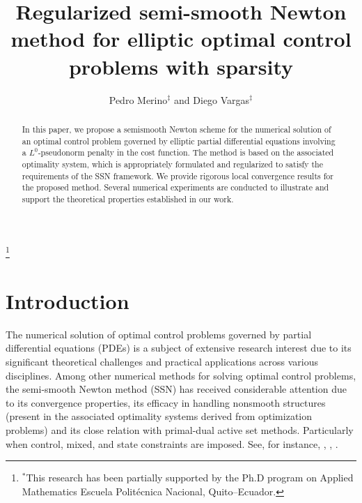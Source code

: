 \documentclass[11pt,a4paper]{amsart}
\begin{document}
	\title[Sparse optimal control]{Regularized semi-smooth Newton method for elliptic optimal control problems with sparsity}
	
	\author{Pedro Merino$^\ddag$ and Diego Vargas$^\ddag$}
	\address{$^\ddag$Research Center of Mathematical Modeling (MODEMAT) and Escuela Polit\'ecnica Nacional, Quito, Ecuador}
	\keywords{}
	\thanks{$^*$This research has been partially supported by the  Ph.D program on Applied Mathematics Escuela Polit\'ecnica Nacional, Quito--Ecuador.}
	
	\smallskip
\begin{abstract}
In this paper, we propose a  semismooth Newton scheme for the numerical solution of an optimal control problem governed by elliptic partial differential equations involving a $L^0$-pseudonorm penalty in the cost function. The method is based on the associated optimality system, which is appropriately formulated and regularized to satisfy the requirements of the SSN framework. We provide rigorous local convergence results for the proposed method.  Several numerical experiments are conducted to illustrate and support the theoretical properties established in our work.

\end{abstract}
	
\maketitle 

\section{Introduction}

The numerical solution of optimal control problems governed by partial differential equations (PDEs) is a subject of extensive research interest due to its significant theoretical challenges and practical applications across various disciplines. Among other numerical methods for solving optimal control problems, the semi-smooth Newton method (SSN) has received considerable attention due to its convergence properties, its efficacy in handling nonsmooth structures (present in the associated optimality systems derived from optimization problems) and its close relation with primal-dual active set methods. Particularly when control, mixed, and state constraints are imposed. See, for instance, \cite{ulbrich2002}, \cite{ito2003semi}, \cite{hint02primal}.
\end{document}
